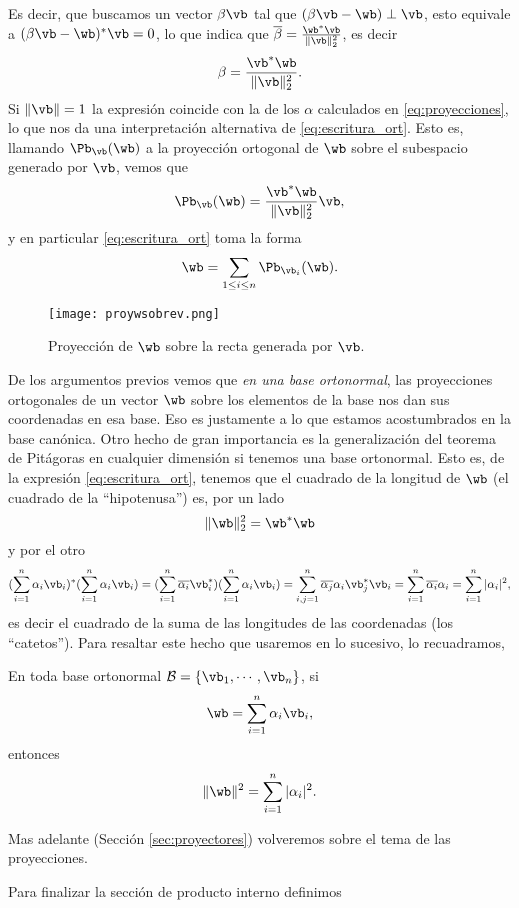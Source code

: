 Es decir, que buscamos un vector $\beta\vb$
 tal que $(\beta\vb -\wb)\perp \vb$, esto equivale a
 $(\beta\vb -\wb)^* \vb=0$, lo que indica que $\overline{\beta}=\frac{\wb^*\vb}{\|\vb\|_2^2}$, es decir
 $$
 \beta=\frac{\vb^*\wb}{\|\vb\|_2^2}.
 $$
 Si $\|\vb\|=1$ la expresión coincide con la de los $\alpha$ calculados en \eqref{eq:proyecciones}, lo que nos da una interpretación alternativa de \eqref{eq:escritura_ort}. Esto es, llamando
 $\Pb_{\vb}(\wb)$ a la proyección ortogonal de $\wb$ sobre el subespacio generado por $\vb$, vemos que
\begin{equation}
 \label{eq:proy_forma1}
 \Pb_{\vb}(\wb)=\frac{\vb^*\wb}{\|\vb\|_2^2}\vb,
\end{equation}
y en particular \eqref{eq:escritura_ort} toma la forma
 $$
 \wb=\sum_{1\le i\le n}\Pb_{\vb_i}(\wb).
 $$

\begin{figure}
\texttt{[image: proywsobrev.png]}
\caption{Proyección de $\wb$ sobre la recta generada por $\vb$.}
 \label{fig:proyusobrev}
\end{figure}

\tcc
De los argumentos previos vemos que \emph{en una base ortonormal}, las proyecciones ortogonales de un vector $\wb$ sobre los elementos de la base nos dan sus coordenadas en esa base. Eso  es justamente a lo que estamos acostumbrados en la base can\'onica.
\etcc
Otro hecho de gran importancia es la generalización del teorema de Pitágoras en cualquier dimensión si tenemos una base ortonormal. Esto es, de la expresión \eqref{eq:escritura_ort}, tenemos que el cuadrado de la longitud de $\wb$ (el cuadrado de la ``hipotenusa'') es, por un lado
$$\|\wb\|^2_2=\wb^*\wb$$ y por el otro
$$
(\sum_{i=1}^n\alpha_i\vb_i)^*(\sum_{i=1}^n\alpha_i\vb_i)=(\sum_{i=1}^n\overline{\alpha_i}\vb_i^*)(\sum_{i=1}^n\alpha_i\vb_i)=
\sum_{i,j=1}^n\overline{\alpha_j}\alpha_i\vb_j^*\vb_i=\sum_{i=1}^n\overline{\alpha_i}\alpha_i=\sum_{i=1}^n|\alpha_i|^2,
$$
es decir el cuadrado de la suma de las longitudes de las coordenadas (los ``catetos'').
Para resaltar este hecho que usaremos en lo sucesivo, lo recuadramos,
\tcc
\begin{rem}
\label{obs:pitagoras}
En toda base ortonormal $\mathcal{B}=\{\vb_1,\cdots,\vb_n\}$, si
$$
\wb=\sum_{i=1}^n\alpha_i\vb_i,
$$
entonces
$$
\|\wb\|^2=\sum_{i=1}^n|\alpha_i|^2.
$$
\end{rem}
\etcc
Mas adelante (Sección \ref{sec:proyectores}) volveremos sobre el tema de las proyecciones.

Para finalizar la sección de producto interno definimos

